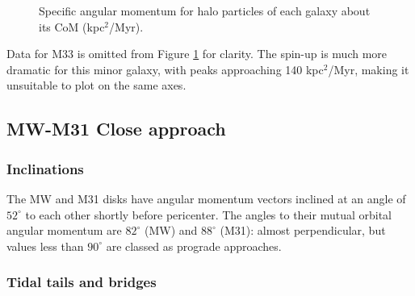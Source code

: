 \documentclass[twocolumn]{aastex63}
\newcommand{\todo}{\color{red}{TODO}\color{black}\hspace{2mm}}
\begin{document}
\begin{figure}[htb!]
	\caption{Specific angular momentum for halo particles of each galaxy about its CoM (kpc$^2$/Myr).
		\label{fig:halo_h}}
\end{figure}

Data for M33 is omitted from Figure \ref{fig:halo_h} for clarity. The spin-up is much more dramatic for this minor galaxy, with peaks approaching 140 kpc$^2$/Myr, making it unsuitable to plot on the same axes.

\todo{effect of radius}

\subsection{MW-M31 Close approach}

\subsubsection{Inclinations}

The MW and M31 disks have angular momentum vectors inclined at an angle of $52^\circ$ to each other shortly before pericenter. The angles to their mutual orbital angular momentum are $82^\circ$ (MW) and $88^\circ$ (M31): almost perpendicular, but values less than $90^\circ$ are classed as prograde approaches.

\subsubsection{Tidal tails and bridges}

\end{document}
